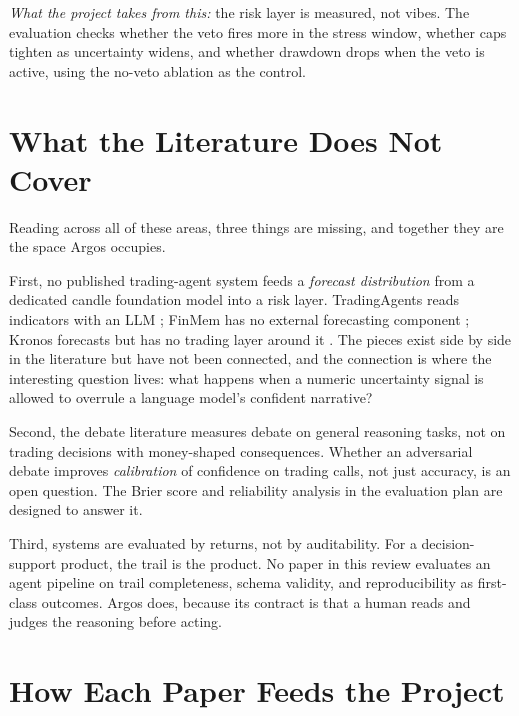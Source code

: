 \documentclass[conference]{IEEEtran}
\newcommand{\sys}{Argos}
\begin{document}
\emph{What the project takes from this:} the risk layer is measured, not vibes. The evaluation checks whether the veto fires more in the stress window, whether caps tighten as uncertainty widens, and whether drawdown drops when the veto is active, using the no-veto ablation as the control.

\section{What the Literature Does Not Cover}
\label{sec:gap}

Reading across all of these areas, three things are missing, and together they are the space \sys{} occupies.

First, no published trading-agent system feeds a \emph{forecast distribution} from a dedicated candle foundation model into a risk layer. TradingAgents reads indicators with an LLM \cite{xiao2024tradingagents}; FinMem has no external forecasting component \cite{yu2023finmem}; Kronos forecasts but has no trading layer around it \cite{shi2025kronos}. The pieces exist side by side in the literature but have not been connected, and the connection is where the interesting question lives: what happens when a numeric uncertainty signal is allowed to overrule a language model's confident narrative?

Second, the debate literature measures debate on general reasoning tasks, not on trading decisions with money-shaped consequences. Whether an adversarial debate improves \emph{calibration} of confidence on trading calls, not just accuracy, is an open question. The Brier score and reliability analysis in the evaluation plan are designed to answer it.

Third, systems are evaluated by returns, not by auditability. For a decision-support product, the trail is the product. No paper in this review evaluates an agent pipeline on trail completeness, schema validity, and reproducibility as first-class outcomes. \sys{} does, because its contract is that a human reads and judges the reasoning before acting.

\section{How Each Paper Feeds the Project}
\label{sec:mapping}
\end{document}
